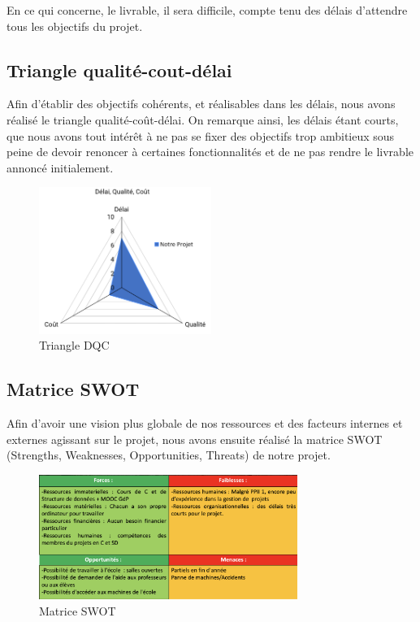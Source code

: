 \documentclass[french,a4paper]{article}
\begin{document}
En ce qui concerne, le livrable, il sera difficile, compte tenu des délais d'attendre tous les objectifs du projet.
\subsection{Triangle qualité-cout-délai}
Afin d’établir des objectifs cohérents, et réalisables dans les délais, nous avons réalisé le triangle qualité-coût-délai. On remarque ainsi, les délais étant courts, que nous avons tout intérêt à ne pas se fixer des objectifs trop ambitieux sous peine de devoir renoncer à certaines fonctionnalités et de ne pas rendre le livrable annoncé initialement.

\begin{figure}[H]
    \centering
    \includegraphics[width=0.5\textwidth]{img/triangle_QCD.png}
    \caption{Triangle DQC}
\end{figure}

\subsection{Matrice SWOT}
Afin d’avoir une vision plus globale de nos ressources et des facteurs internes et externes agissant sur le projet, nous avons ensuite réalisé la matrice SWOT (Strengths, Weaknesses, Opportunities, Threats) de notre projet.

\begin{figure}[H]
    \centering
    \includegraphics[width=0.75\textwidth]{img/SWOT.png}
    \caption{Matrice SWOT}
\end{figure}
\end{document}
